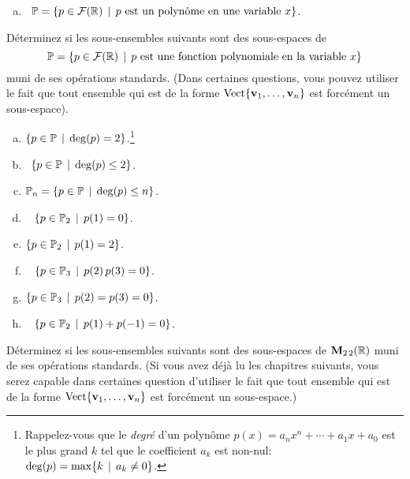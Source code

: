 \begin{prob}
\begin{enumerate}[a)]
 \item\sov~$\mathbb{P}=\{p \in \mathcal{F}(\mathbb{R})   \, \mid \, p \text{ est un polyn\^ome en une variable } x\}$. \medskip 

\end{enumerate}


\end{prob} \begin{prob} \label{prob05.3} Déterminez si les sous-ensembles suivants sont des sous-espaces de $$\mathbb{P} =\{p \in \mathcal{F}(\mathbb{R}) \, \mid \, p \text{ est une fonction polynomiale en la variable } x\}$$ muni de ses opérations standards. (Dans certaines questions, vous pouvez utiliser le fait que tout ensemble qui est de la forme $\operatorname{ Vect} \normalsize\{\mathbf{v}_1, \dots, \mathbf{v}_n\normalsize\}$ est forcément un sous-espace).
 
\medskip
\begin{enumerate}[a)]

\item $\{p \in \mathbb{P}   \, \mid \, \deg(p)=2 \}$.\footnote{Rappelez-vous que le {\it degré} d'un polynôme $p(x)=a_n x^n +\cdots +a_1 x +a_0$ est le plus grand $k$ tel que le coefficient $a_k$ est non-nul: $\deg(p)=\max\{k\, \mid \, a_k\not=0\}$.}   \medskip 
 

\item\sov~$\{p \in \mathbb{P}   \, \mid \, \deg(p)
\le 2 \}$.  \medskip 
 

\item $\mathbb{P}_n= \{p \in \mathbb{P}   \, \mid \,  \deg(p)\le n\}$.  \medskip 
  
 

\item\sov~ $ \{p \in \mathbb{P}_2 \, \mid \,  p(1)=0\}$.  \medskip


\item  $ \{p \in \mathbb{P}_2 \, \mid \,  p(1)=2\}$.  \medskip


\item\sov~ $ \{p \in \mathbb{P}_3 \, \mid \,  p(2)\,p(3)=0\}$.  \medskip


\item  $ \{p \in \mathbb{P}_3 \, \mid \,  p(2)=p(3)=0\}$.  \medskip


\item\sov~ $ \{p \in \mathbb{P}_2 \, \mid \,  p(1)+p(-1)=0\}$.      \medskip


\end{enumerate}
 
\end{prob} \begin{prob} \label{prob05.4} Déterminez si les sous-ensembles suivants sont des sous-espaces de $\mathbf{M}_{2 \,2}(\mathbb{R})$ muni de ses opérations standards. (Si vous avez déjà lu les chapitres suivants, vous serez capable dans certaines question d'utiliser le fait que tout ensemble qui est de la forme $\operatorname{ Vect} \normalsize\{\mathbf{v}_1, \dots, \mathbf{v}_n\normalsize\}$ est forcément un sous-espace.)
\begin{enumerate}[a)]\medskip



\end{enumerate}
\end{prob}
